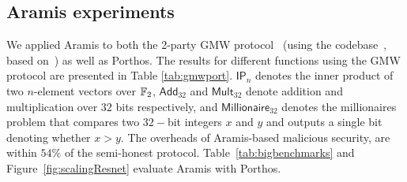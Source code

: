 \subsection{Aramis experiments}\label{subsec:aramisexperiments}
We applied Aramis to both the 2-party GMW protocol~\cite{gmw} (using the codebase~\cite{gmwcode}, based on~\cite{gmwpaper}) as well as Porthos. 
The results for different functions using the GMW protocol are presented in Table \ref{tab:gmwport}. $\mathsf{IP}_n$ denotes the inner product of two $n$-element vectors over $\mathbb{F}_2$, $\mathsf{Add}_{32}$ and $\mathsf{Mult}_{32}$ denote addition and multiplication over $32$ bits respectively, and $\mathsf{Millionaire}_{32}$ denotes the millionaires problem that compares two $32-$bit integers $x$ and $y$ and outputs a single bit denoting whether $x>y$.  The overheads of Aramis-based malicious security, are within $54\%$ of the semi-honest protocol. Table~\ref{tab:bigbenchmarks} and Figure~\ref{fig:scalingResnet} evaluate Aramis with Porthos.



